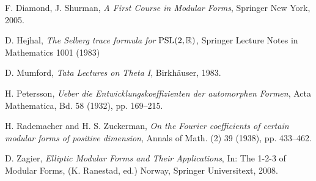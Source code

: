 \begin{thebibliography}{10}



 {\sc F. Diamond, J. Shurman}, \emph{A First Course in Modular Forms}, Springer New York, 2005.



 {\sc D. Hejhal}, {\em The Selberg trace formula for $\mathrm{PSL}(2, \mathbb{R})$},  Springer Lecture Notes in Mathematics 1001 (1983)


 {\sc D. Mumford}, {\em Tata Lectures on Theta I}, Birkh\"auser, 1983.



 {\sc H. Petersson}, {\em Ueber die Entwicklungskoeffizienten der automorphen Formen}, Acta Mathematica, Bd. 58 (1932),  pp. 169--215.


 {\sc H. Rademacher and H. S. Zuckerman}, {\em On the Fourier coefficients of certain modular forms of
positive dimension}, Annals of Math. (2) 39 (1938),  pp. 433--462.




 {\sc D. Zagier}, {\em Elliptic Modular Forms and Their Applications}, In:  The 1-2-3 of Modular Forms, (K. Ranestad, ed.) Norway, Springer Universitext, 2008.
\end{thebibliography}

